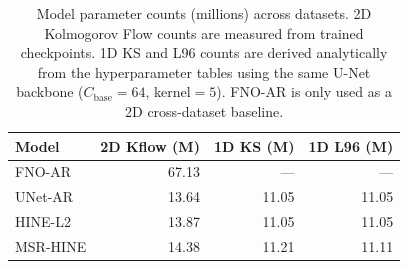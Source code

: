 \begin{table}[t]
\centering
\caption{Model parameter counts (millions) across datasets. 2D Kolmogorov Flow counts are measured from trained checkpoints. 1D KS and L96 counts are derived analytically from the hyperparameter tables using the same U-Net backbone ($C_\text{base}=64$, kernel$=5$). FNO-AR is only used as a 2D cross-dataset baseline.}
\label{tab:param_counts}
\begin{tabular}{lrrr}
\toprule
Model & 2D Kflow (M) & 1D KS (M) & 1D L96 (M) \\
\midrule
FNO-AR & 67.13 & — & — \\
UNet-AR & 13.64 & 11.05 & 11.05 \\
HINE-L2 & 13.87 & 11.05 & 11.05 \\
MSR-HINE & 14.38 & 11.21 & 11.11 \\
\bottomrule
\end{tabular}
\end{table}